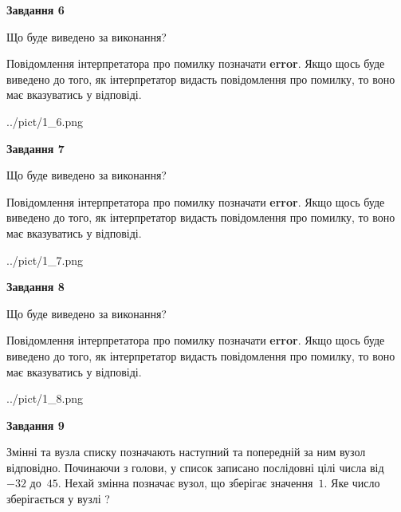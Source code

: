 \documentclass[12pt, ukrainian]{article}
\begin{document}
{\begin {large}
{\begin {center}\textbf{Завдання 6}\end {center}}\par
Що буде виведено за виконання?

Повідомлення інтерпретатора про помилку позначати \textbf{error}.
Якщо щось буде виведено до того, як інтерпретатор видасть повідомлення про помилку, 
то воно має вказуватись у відповіді. \par


\begin{center}
	{../pict/1_6.png}
\end{center}
\newpage

{\begin {center}\textbf{Завдання 7}\end {center}}\par
Що буде виведено за виконання?

Повідомлення інтерпретатора про помилку позначати \textbf{error}.
Якщо щось буде виведено до того, як інтерпретатор видасть повідомлення про помилку, 
то воно має вказуватись у відповіді. \par


\begin{center}
	{../pict/1_7.png}
\end{center}
\newpage

{\begin {center}\textbf{Завдання 8}\end {center}}\par
Що буде виведено за виконання?

Повідомлення інтерпретатора про помилку позначати \textbf{error}.
Якщо щось буде виведено до того, як інтерпретатор видасть повідомлення про помилку, 
то воно має вказуватись у відповіді. \par


\begin{center}
	{../pict/1_8.png}
\end{center}
\newpage

{\begin {center}\textbf{Завдання 9}\end {center}}\par
Змінні  та  вузла списку позначають наступний та попередній за ним вузол відповідно. Починаючи з голови, у список записано послідовні цілі числа від~$-32$ до~$45$. Нехай змінна  позначає вузол, що зберігає значення~$1$.
Яке число зберігається у вузлі  ?\par
\newpage


\end{large}}
\end{document}
